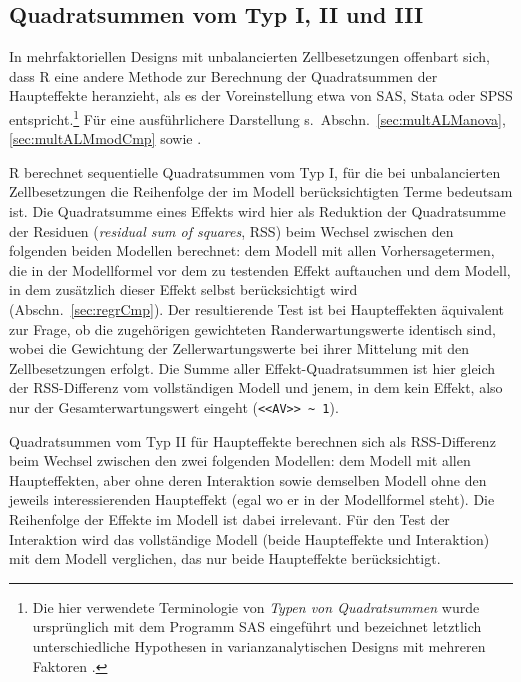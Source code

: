 \subsection{Quadratsummen vom Typ I, II und III}
\label{sec:ssTypes}

In mehrfaktoriellen Designs mit unbalancierten Zellbesetzungen offenbart sich, dass R eine andere Methode zur Berechnung der Quadratsummen der Haupteffekte heranzieht, als es der Voreinstellung etwa von SAS, Stata oder SPSS entspricht.\footnote{Die hier verwendete Terminologie von \emph{Typen von Quadratsummen} wurde ursprünglich mit dem Programm SAS eingeführt und bezeichnet letztlich unterschiedliche Hypothesen in varianzanalytischen Designs mit mehreren Faktoren \cite{Blair1978}.} Für eine ausführlichere Darstellung s.\ Abschn.\ \ref{sec:multALManova}, \ref{sec:multALMmodCmp} sowie .

R berechnet sequentielle Quadratsummen vom Typ I, für die bei unbalancierten Zellbesetzungen die Reihenfolge der im Modell berücksichtigten Terme bedeutsam ist. Die Quadratsumme eines Effekts wird hier als Reduktion der Quadratsumme der Residuen (\emph{residual sum of squares}, RSS) beim Wechsel zwischen den folgenden beiden Modellen berechnet: dem Modell mit allen Vorhersagetermen, die in der Modellformel vor dem zu testenden Effekt auftauchen und dem Modell, in dem zusätzlich dieser Effekt selbst berücksichtigt wird (Abschn.\ \ref{sec:regrCmp}). Der resultierende Test ist bei Haupteffekten äquivalent zur Frage, ob die zugehörigen gewichteten Randerwartungswerte identisch sind, wobei die Gewichtung der Zellerwartungswerte bei ihrer Mittelung mit den Zellbesetzungen erfolgt. Die Summe aller Effekt-Quadratsummen ist hier gleich der RSS-Differenz vom vollständigen Modell und jenem, in dem kein Effekt, also nur der Gesamterwartungswert eingeht (\lstinline!<<AV>> ~ 1!).

Quadratsummen vom Typ II für Haupteffekte berechnen sich als RSS-Differenz beim Wechsel zwischen den zwei folgenden Modellen: dem Modell mit allen Haupteffekten, aber ohne deren Interaktion sowie demselben Modell ohne den jeweils interessierenden Haupteffekt (egal wo er in der Modellformel steht). Die Reihenfolge der Effekte im Modell ist dabei irrelevant. Für den Test der Interaktion wird das vollständige Modell (beide Haupteffekte und Interaktion) mit dem Modell verglichen, das nur beide Haupteffekte berücksichtigt.

